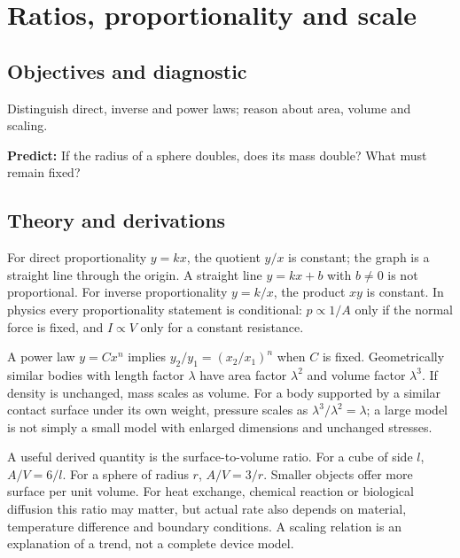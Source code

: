 \documentclass[11pt,a4paper,openany]{book}
\begin{document}
\chapter{Ratios, proportionality and scale}
\section{Objectives and diagnostic}
Distinguish direct, inverse and power laws; reason about area, volume and scaling.

\textbf{Predict:} If the radius of a sphere doubles, does its mass double? What must remain fixed?
\section{Theory and derivations}
For direct proportionality $y=kx$, the quotient $y/x$ is constant; the graph is a straight line through the origin. A straight line $y=kx+b$ with $b\ne0$ is not proportional. For inverse proportionality $y=k/x$, the product $xy$ is constant. In physics every proportionality statement is conditional: $p\propto1/A$ only if the normal force is fixed, and $I\propto V$ only for a constant resistance.

A power law $y=Cx^n$ implies $y_2/y_1=(x_2/x_1)^n$ when $C$ is fixed. Geometrically similar bodies with length factor $\lambda$ have area factor $\lambda^2$ and volume factor $\lambda^3$. If density is unchanged, mass scales as volume. For a body supported by a similar contact surface under its own weight, pressure scales as $\lambda^3/\lambda^2=\lambda$; a large model is not simply a small model with enlarged dimensions and unchanged stresses.

A useful derived quantity is the surface-to-volume ratio. For a cube of side $l$, $A/V=6/l$. For a sphere of radius $r$, $A/V=3/r$. Smaller objects offer more surface per unit volume. For heat exchange, chemical reaction or biological diffusion this ratio may matter, but actual rate also depends on material, temperature difference and boundary conditions. A scaling relation is an explanation of a trend, not a complete device model.
\begin{center}
\end{center}
\end{document}
